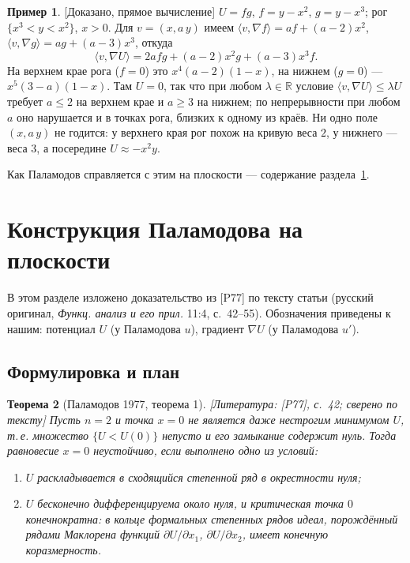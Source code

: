 \documentclass[11pt,a4paper]{article}
\newtheorem{theorem}{Теорема}[section]
\theoremstyle{definition}
\newtheorem{example}[theorem]{Пример}
\newcommand{\R}{\mathbb R}
\newcommand{\mk}[1]{\textsf{[#1]}}
\begin{document}
\begin{example}\label{ex:two-weights}
\mk{Доказано, прямое вычисление} $U=fg$, $f=y-x^2$, $g=y-x^3$; рог $\{x^3<y<x^2\}$, $x>0$. Для
$v=(x,a\,y)$ имеем $\langle v,\nabla f\rangle=af+(a-2)x^2$, $\langle v,\nabla g\rangle=ag+(a-3)x^3$,
откуда
\[
\langle v,\nabla U\rangle=2afg+(a-2)x^2g+(a-3)x^3f .
\]
На верхнем крае рога ($f=0$) это $x^4(a-2)(1-x)$, на нижнем ($g=0$) --- $x^5(3-a)(1-x)$. Там $U=0$,
так что при любом $\lambda\in\R$ условие $\langle v,\nabla U\rangle\le\lambda U$ требует $a\le2$ на
верхнем крае и $a\ge3$ на нижнем; по непрерывности при любом $a$ оно нарушается и в точках рога,
близких к одному из краёв. Ни одно поле $(x,a\,y)$ не годится: у верхнего края рог похож на кривую
веса $2$, у нижнего --- веса $3$, а посередине $U\approx-x^2y$.
\end{example}

Как Паламодов справляется с этим на плоскости --- содержание раздела~\ref{sec:plane}.

\section{Конструкция Паламодова на плоскости}\label{sec:plane}

В этом разделе изложено доказательство из [P77] по тексту статьи (русский оригинал,
\emph{Функц. анализ и его прил.} 11:4, с.~42--55). Обозначения приведены к нашим: потенциал $U$
(у Паламодова $u$), градиент $\nabla U$ (у Паламодова $u'$).

\subsection{Формулировка и план}

\begin{theorem}[Паламодов 1977, теорема 1]\label{thm:P77}
\mk{Литература: [P77], с.~42; сверено по тексту} Пусть $n=2$ и точка $x=0$ не является даже
нестрогим минимумом $U$, т.\,е. множество $\{U<U(0)\}$ непусто и его замыкание содержит нуль. Тогда равновесие $x=0$ неустойчиво, если выполнено одно из условий:
\begin{enumerate}[label=\Alph*)]
\item $U$ раскладывается в сходящийся степенной ряд в окрестности нуля;
\item $U$ бесконечно дифференцируема около нуля, и критическая точка $0$ конечнократна: в
кольце формальных степенных рядов идеал, порождённый рядами Маклорена функций
$\partial U/\partial x_1$, $\partial U/\partial x_2$, имеет конечную коразмерность.
\end{enumerate}
\end{theorem}
\end{document}
